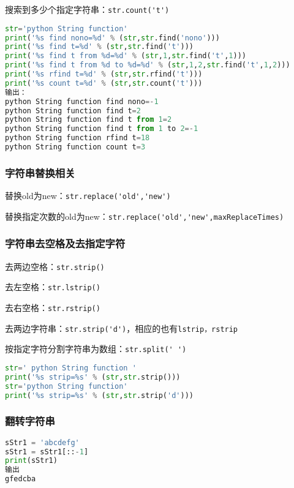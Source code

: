 搜索到多少个指定字符串：\verb|str.count('t')|

\begin{lstlisting}[language=python]
str='python String function'
print('%s find nono=%d' % (str,str.find('nono')))
print('%s find t=%d' % (str,str.find('t')))
print('%s find t from %d=%d' % (str,1,str.find('t',1)))
print('%s find t from %d to %d=%d' % (str,1,2,str.find('t',1,2)))
print('%s rfind t=%d' % (str,str.rfind('t')))
print('%s count t=%d' % (str,str.count('t')))
输出：
python String function find nono=-1
python String function find t=2
python String function find t from 1=2
python String function find t from 1 to 2=-1
python String function rfind t=18
python String function count t=3
\end{lstlisting}

\subsubsection{字符串替换相关}

替换old为new：\verb|str.replace('old','new')|

替换指定次数的old为new：\verb|str.replace('old','new',maxReplaceTimes)|


\subsubsection{字符串去空格及去指定字符}

去两边空格：\verb|str.strip()|

去左空格：\verb|str.lstrip()|

去右空格：\verb|str.rstrip()|

去两边字符串：\verb|str.strip('d')|，相应的也有\verb|lstrip，rstrip|

按指定字符分割字符串为数组：\verb|str.split(' ')|

\begin{lstlisting}[language=python]
str=' python String function '
print('%s strip=%s' % (str,str.strip()))
str='python String function'
print('%s strip=%s' % (str,str.strip('d')))
\end{lstlisting}



\subsubsection{翻转字符串}
\begin{lstlisting}[language=python]
sStr1 = 'abcdefg'
sStr1 = sStr1[::-1]
print(sStr1)
输出
gfedcba
\end{lstlisting}

